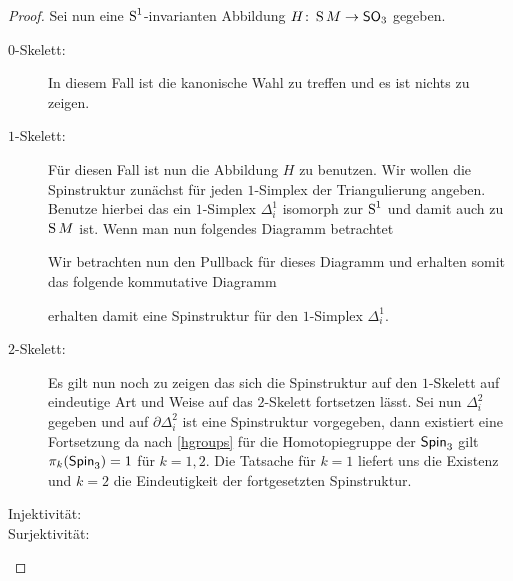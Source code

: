 \begin{Satz}
\begin{proof}
          Sei nun eine $\S^1$-invarianten Abbildung
          $\abb{H}{\S M}{\so_3}$ gegeben.
          \begin{description}
          \item[$0$-Skelett:] In diesem Fall ist die kanonische Wahl
            zu treffen und es ist nichts zu zeigen.
          \item[$1$-Skelett:] Für diesen Fall ist nun die Abbildung
            $H$ zu benutzen. Wir wollen die Spinstruktur zunächst für
            jeden $1$-Simplex der Triangulierung angeben.  Benutze
            hierbei das ein $1$-Simplex $\Delta^1_i$ isomorph zur
            $\S^1$ und damit auch zu $\S M$ ist. Wenn man nun
            folgendes Diagramm betrachtet
            \begin{center}
            \end{center}
            Wir betrachten nun den Pullback für dieses Diagramm und
            erhalten somit das folgende kommutative Diagramm
            \begin{center}
            \end{center}
            erhalten damit eine Spinstruktur für den $1$-Simplex
            $\Delta^1_i$. 
          \item[$2$-Skelett:] Es gilt nun noch zu zeigen das sich die
            Spinstruktur auf den $1$-Skelett auf eindeutige Art und
            Weise auf das $2$-Skelett fortsetzen lässt.  Sei nun
            $\Delta^2_i$ gegeben und auf $\partial\Delta^2_i$ ist eine
            Spinstruktur vorgegeben, dann existiert eine Fortsetzung
            da nach \cref{hgroups} für die Homotopiegruppe der
            $\spin_3$ gilt $\pi_k(\spin_3)=1$ für $k=1,2$.  Die
            Tatsache für $k=1$ liefert uns die Existenz und $k=2$ die
            Eindeutigkeit der fortgesetzten Spinstruktur.
          \item[Injektivität:]
          \item[Surjektivität:]
          \end{description}
	\end{proof}
\end{Satz}



